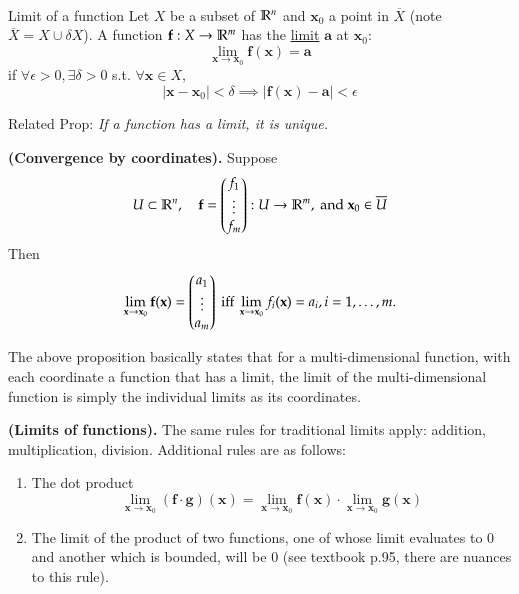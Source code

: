 \\

\begin{defn}{Limit of a function}
Let $X$ be a subset of $\mathbb{R}^n$ and $\bm{x}_0$ a point in $\overline{X}$ (note $\overline{X}=X\cup \delta X$). A function $\textbf{f} : X \rightarrow \mathbb{R}^m$ has the \ul{limit} $\bm{a}$ at $\bm{x}_0$:
\[\lim_{\bm{x}\rightarrow \bm{x}_0}\bm{f}(\bm{x}) = \bm{a}\]
if $\forall \epsilon > 0, \exists\delta > 0$ s.t. $\forall\bm{x}\in X$,
\[|\bm{x}-\bm{x}_0|<\delta \implies |\bm{f}(\bm{x})-\bm{a}|<\epsilon\]

Related Prop: \emph{If a function has a limit, it is unique. }
\end{defn}

\begin{proposition}
\textbf{(Convergence by coordinates).} Suppose
\[U\subset \mathbb{R}^n, \quad \textbf{f}=\begin{pmatrix} f_1 \\ \vdots \\ f_m \end{pmatrix}: U\rightarrow \mathbb{R}^m,\text{ and }\textbf{x}_0\in\overline{U}\]
Then
\[\lim_{\textbf{x}\to\textbf{x}_0} \textbf{f}(\textbf{x})=\begin{pmatrix} a_1 \\ \vdots \\ a_m \end{pmatrix}\text{ iff }\lim_{\textbf{x}\to\textbf{x}_0} f_i(\textbf{x})=a_i, i=1,\dots,m.\]
\end{proposition}

The above proposition basically states that for a multi-dimensional function, with each coordinate a function that has a limit, the limit of the multi-dimensional function is simply the individual limits as its coordinates. 

\begin{theorem}
  \textbf{(Limits of functions).} The same rules for traditional limits apply: addition, multiplication, division. Additional rules are as follows:
  \begin{enumerate}
    \item The dot product
    \[\lim_{\bm{x}\to\bm{x}_0}(\bm{f} \cdot \bm{g})(\bm{x})=\lim_{\bm{x}\to\bm{x}_0}\bm{f}(\bm{x})\cdot \lim_{\bm{x}\to\bm{x}_0}\bm{g}(\bm{x})\]
    \item The limit of the product of two functions, one of whose limit evaluates to $0$ and another which is bounded, will be $0$ (see textbook p.95, there are nuances to this rule).
  \end{enumerate}
\end{theorem}

